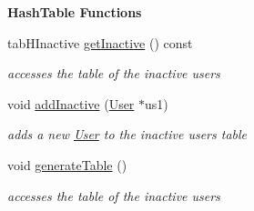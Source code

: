 \begin{Indent}\textbf{ Hash\+Table Functions}\par
\begin{DoxyCompactItemize}
\item 
tab\+H\+Inactive \hyperlink{group___agency_ga6e06b2cf396c6d41ed4d5e2f215a3035}{get\+Inactive} () const
\begin{DoxyCompactList}\small\item\em accesses the table of the inactive users \end{DoxyCompactList}\item 
void \hyperlink{group___agency_gaca43b6ff4d5b43aae73779cf271ac0fe}{add\+Inactive} (\hyperlink{class_user}{User} $\ast$us1)
\begin{DoxyCompactList}\small\item\em adds a new \hyperlink{class_user}{User} to the inactive users table \end{DoxyCompactList}\item 
void \hyperlink{group___agency_ga4ef49242ff8030eddb766972f7555437}{generate\+Table} ()
\begin{DoxyCompactList}\small\item\em accesses the table of the inactive users \end{DoxyCompactList}\end{DoxyCompactItemize}
\end{Indent}

